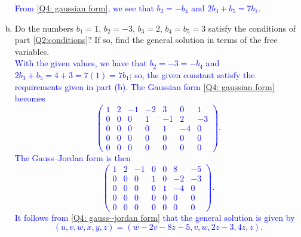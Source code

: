 \documentclass[a4paper,11pt]{article}
\newcommand{\BB}[1]{\textcolor{blue}{#1}}
\begin{document}
\begin{enumerate}[(a)]
  \BB{
    From \eqref{Q4: gaussian form}, we see that $b_2=-b_4$ and $2b_3+b_5=7b_1$. \\
  }

\item Do the numbers $b_1=1$, $b_2=-3$, $b_3=2$, $b_4=b_5=3$ satisfy the
  conditions of part \ref{Q2:conditions}? If so, find the general solution in
  terms of the free variables. \\

  \BB{
    With the given values, we have that $b_2=-3=-b_4$ and
    $2b_3+b_5=4+3=7(1)=7b_1$; so, the given constant satisfy the requirements
    given in part (b). The Gaussian form \eqref{Q4: gaussian form} becomes
    \begin{equation}\label{Q4: gaussian form 2}
      \left(
        \begin{array}{rrrrrr|r}
          1 & 2 & -1 & -2 & 3 & 0 & 1 \\
          0 & 0 & 0 & 1 & -1 & 2 & -3 \\
          0 & 0 & 0 & 0 & 1 & -4 & 0 \\
          0 & 0 & 0 & 0 & 0 & 0 & 0 \\
          0 & 0 & 0 & 0 & 0 & 0 & 0
        \end{array}
      \right).
    \end{equation}
    The Gauss--Jordan form is then
    \begin{equation}\label{Q4: gauss--jordan form}
      \left(
        \begin{array}{rrrrrr|r}
          1 & 2 & -1 & 0 & 0 & 8 & -5 \\
          0 & 0 & 0 & 1 & 0 & -2 & -3 \\
          0 & 0 & 0 & 0 & 1 & -4 & 0 \\
          0 & 0 & 0 & 0 & 0 & 0 & 0 \\
          0 & 0 & 0 & 0 & 0 & 0 & 0
        \end{array}
      \right).
    \end{equation}
    It follows from \eqref{Q4: gauss--jordan form} that the general solution is
    given by
    \[
      (u,v,w,x,y,z) = (w-2v-8z-5,v,w,2z-3,4z,z).
    \]
  }
\end{enumerate}
\end{document}
